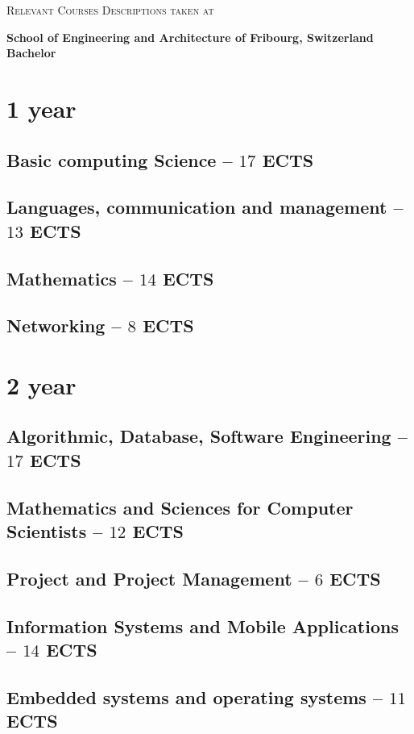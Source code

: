\documentclass[11pt]{article}
\newcommand*{\heia}{School of Engineering and Architecture of Fribourg}
\newcommand{\module}[2]{
    \subsection{#1 \small -- $#2$ ECTS}
}
\begin{document}
\textsc{\LARGE Relevant Courses Descriptions taken at}%
\begin{center}
    \textbf{\heia{}, Switzerland\\Bachelor}
\end{center}


%
%
\section{1 year}
\module{Basic computing Science}{17}
\pagebreak

\module{Languages, communication and management}{13}
\pagebreak

\module{Mathematics}{14}
\pagebreak
\pagebreak

\module{Networking}{8}


%
%
\section{2 year}
\module{Algorithmic, Database, Software Engineering}{17}
\pagebreak
\module{Mathematics and Sciences for Computer Scientists}{12}
\module{Project and Project Management}{6}
\module{Information Systems and Mobile Applications}{14}
\module{Embedded systems and operating systems}{11}
\end{document}
